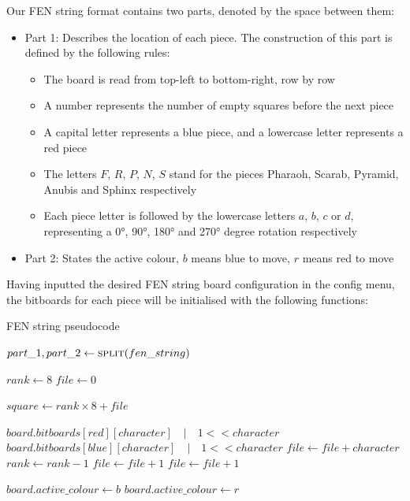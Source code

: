 \documentclass[../main/main.tex]{subfiles}
\begin{document}
\noindent Our FEN string format contains two parts, denoted by the space between them:

\begin{itemize}
\item Part 1: Describes the location of each piece. The construction of this part is defined by the following rules:
\begin{itemize}
\item The board is read from top-left to bottom-right, row by row
\item A number represents the number of empty squares before the next piece
\item A capital letter represents a blue piece, and a lowercase letter represents a red piece
\item The letters $F$, $R$, $P$, $N$, $S$ stand for the pieces Pharaoh, Scarab, Pyramid, Anubis and Sphinx respectively
\item Each piece letter is followed by the lowercase letters $a$, $b$, $c$ or $d$, representing a 0°, 90°, 180° and 270° degree rotation respectively
\end{itemize}
\item Part 2: States the active colour, $b$ means blue to move, $r$ means red to move
\end{itemize}

Having inputted the desired FEN string board configuration in the config menu, the bitboards for each piece will be initialised with the following functions:

\begin{algorithm}[H]
\caption{FEN string pseudocode}
\label{alg:fen-string}
\begin{algorithmic}
        \State $part\_1, part\_2 \gets \Call{split}{fen\_string}$

        \State$rank \gets 8$
        \State$file \gets 0$

        \bigskip

            \State$square \gets rank \times 8 + file$

                    \State $board.bitboards[red][character] \quad | \quad 1 << character$
                \Else
                    \State $board.bitboards[blue][character] \quad | \quad 1 << character$
                \EndIf
                \State $file \gets file + character$
                \State $rank \gets rank - 1$
                \State $file \gets file + 1$
            \Else
                \State $file \gets file + 1$
            \EndIf
        
        \bigskip

            \State $board.active\_colour \gets b$
        \Else
            \State $board.active\_colour \gets r$
        \EndIf
        \EndFor
    \EndFunction
\end{algorithmic}
\end{algorithm}
\end{document}
